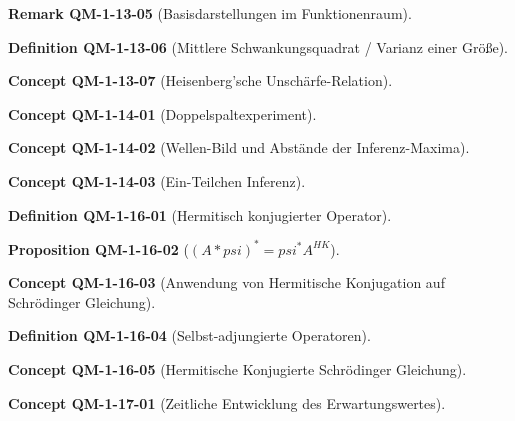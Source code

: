 \documentclass[10pt, letterpaper]{article}
\newcommand{\CustomHeading}[3]{%
  \par\medskip\noindent%
  \textbf{#1 #2} \textnormal{(#3)}.\enskip%
}
\newenvironment{DEF}[2]{\CustomHeading{Definition}{#1}{#2}}{}
\newenvironment{PROP}[2]{\CustomHeading{Proposition}{#1}{#2}}{}
\newenvironment{REM}[2]{\CustomHeading{Remark}{#1}{#2}}{}
\newenvironment{CONC}[2]{\CustomHeading{Concept}{#1}{#2}}{}
\begin{document}
\begin{REM}{QM-1-13-05}{Basisdarstellungen im Funktionenraum}
\end{REM}

\begin{DEF}{QM-1-13-06}{Mittlere Schwankungsquadrat / Varianz einer Größe}
\end{DEF}

\begin{CONC}{QM-1-13-07}{Heisenberg'sche Unschärfe-Relation}
\end{CONC}

\begin{CONC}{QM-1-14-01}{Doppelspaltexperiment}
\end{CONC}

\begin{CONC}{QM-1-14-02}{Wellen-Bild und Abstände der Inferenz-Maxima}
\end{CONC}

\begin{CONC}{QM-1-14-03}{Ein-Teilchen Inferenz}
\end{CONC}

\begin{DEF}{QM-1-16-01}{Hermitisch konjugierter Operator}
\end{DEF}

\begin{PROP}{QM-1-16-02}{$(A*psi)^*=psi^*A^{HK}$}
\end{PROP}

\begin{CONC}{QM-1-16-03}{Anwendung von Hermitische Konjugation auf Schrödinger Gleichung}
\end{CONC}

\begin{DEF}{QM-1-16-04}{Selbst-adjungierte Operatoren}
\end{DEF}

\begin{CONC}{QM-1-16-05}{Hermitische Konjugierte Schrödinger Gleichung}
\end{CONC}

\begin{CONC}{QM-1-17-01}{Zeitliche Entwicklung des Erwartungswertes}
\end{CONC}
\end{document}
